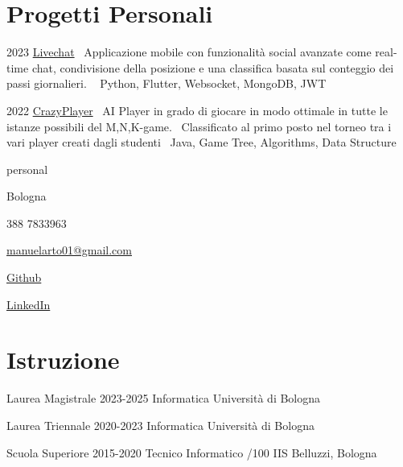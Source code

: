 \documentclass{tccv}
\begin{document}
\section{Progetti Personali}

\begin{yearlist}

\item{2023}
     {\href{https://github.com/manuelarto/livechat}{Livechat}}
     {\textbullet~Applicazione mobile con funzionalità social avanzate come real-time chat, condivisione della posizione e una classifica basata sul conteggio dei passi giornalieri. \newline
    \textbullet~ Python, Flutter, Websocket, MongoDB, JWT}
\item{2022}
     {\href{https://github.com/manuelarto/crazyplayer}{CrazyPlayer}}
     {\textbullet~AI Player in grado di giocare in modo ottimale in tutte le istanze possibili del M,N,K-game. \newline
     \textbullet~Classificato al primo posto nel torneo tra i vari player creati dagli studenti  \newline
    \textbullet~Java, Game Tree, Algorithms, Data Structure}
\end{yearlist}


\newpage


\begin{keyvaluelist}{personal}
    \item[\faHome] Bologna
    \item[\faPhone] 388 7833963
    \item[\faEnvelope] \href{mailto:my@email.address}{manuelarto01@gmail.com}
    \item[\faGithub] \href{https://github.com/manuelarto}{Github}
    \item[\faLinkedin] \href{https://www.linkedin.com/in/manuel-arto-696012203/}{LinkedIn}
\end{keyvaluelist}


\section{Istruzione}

\begin{yearlist}

\item[Laurea Magistrale]{2023-2025}
     {Informatica}
     {Università di Bologna}

\item[Laurea Triennale]{2020-2023}
    {Informatica}
    {Università di Bologna}

\item[Scuola Superiore]{2015-2020}
    {Tecnico Informatico /100}
    {IIS Belluzzi, Bologna}

\end{yearlist}
\end{document}
